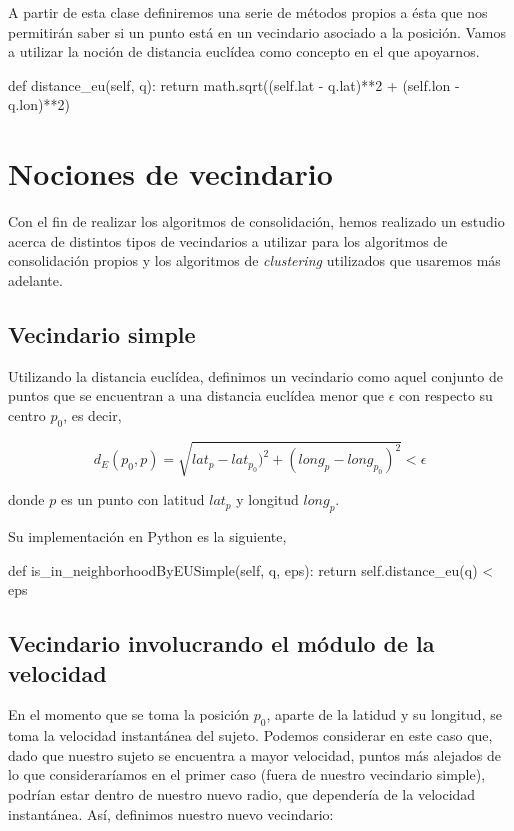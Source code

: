 \documentclass[a4paper, 12pt]{article}
\begin{document}
A partir de esta clase definiremos una serie de m\'etodos propios a \'esta que nos permitir\'an saber si un punto est\'a en un vecindario asociado a la posici\'on. Vamos a utilizar la noci\'on de distancia eucl\'idea como concepto en el que apoyarnos.\\

\begin{python}
        def distance_eu(self, q):
                return math.sqrt((self.lat - q.lat)**2 
                	+ (self.lon - q.lon)**2)
\end{python}


\pagebreak
\section{Nociones de vecindario}

Con el fin de realizar los algoritmos de consolidaci\'on, hemos realizado un estudio acerca de distintos tipos de vecindarios a utilizar para los algoritmos de consolidaci\'on propios y los algoritmos de \textit{clustering} utilizados que usaremos m\'as adelante.

\subsection{Vecindario simple}

Utilizando la distancia eucl\'idea, definimos un vecindario como aquel conjunto de puntos que se  encuentran a una distancia eucl\'idea menor que $\epsilon$ con respecto su centro $p_0$, es decir,

$$ d_E(p_0, p) = \sqrt{lat_{p} - lat_{p_0})^2 + (long_{p} - long_{p_0})^2 } < \epsilon $$

donde $p$ es un punto con latitud $lat_{p}$ y longitud $long_{p}$.

Su implementaci\'on en Python es la siguiente,

\begin{python}
        def is_in_neighborhoodByEUSimple(self, q, eps):
                return self.distance_eu(q) < eps
\end{python}


\subsection{Vecindario involucrando el m\'odulo de la velocidad}

En el momento que se toma la posici\'on $p_0$, aparte de la latidud y su longitud, se toma la velocidad instant\'anea del sujeto. Podemos considerar en este caso que, dado que nuestro sujeto se  encuentra a mayor velocidad, puntos m\'as alejados de lo que considerar\'iamos en el primer caso (fuera de nuestro vecindario simple), podr\'ian estar dentro de nuestro nuevo radio, que depender\'ia de la velocidad instant\'anea. As\'i, definimos nuestro nuevo vecindario:
\end{document}
